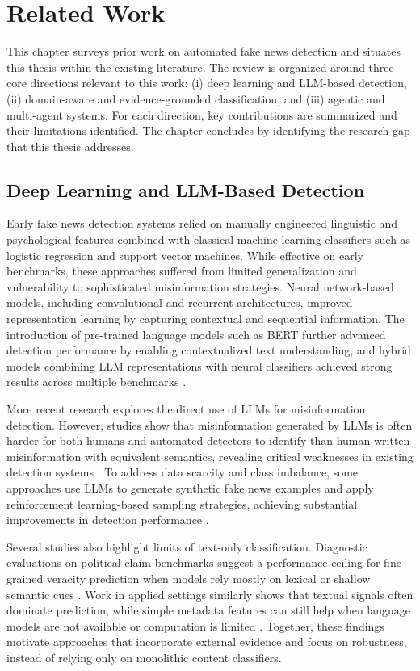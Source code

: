 \chapter{Related Work}

This chapter surveys prior work on automated fake news detection and situates this thesis within the existing literature. The review is organized around three core directions relevant to this work: (i) deep learning and LLM-based detection, (ii) domain-aware and 
evidence-grounded classification, and (iii) agentic and multi-agent systems. For each direction, key contributions are summarized and their limitations identified. The chapter concludes by identifying the research gap that this thesis addresses.

\section{Deep Learning and LLM-Based Detection}

Early fake news detection systems relied on manually engineered linguistic and psychological features combined with classical machine learning classifiers such as logistic regression and support vector machines. While effective on early benchmarks, these approaches suffered from limited generalization and vulnerability to sophisticated misinformation strategies. Neural network-based models, including convolutional and recurrent architectures, improved representation learning by capturing contextual and sequential information. The introduction of pre-trained language models such as BERT further advanced detection performance by enabling contextualized text understanding, and hybrid models combining LLM representations with neural classifiers achieved strong results across multiple benchmarks \cite{10.1145/3728725.3728739}.

More recent research explores the direct use of LLMs for misinformation detection. However, studies show that misinformation generated by LLMs is often harder for both humans and automated detectors to identify than human-written misinformation with equivalent semantics, revealing critical weaknesses in existing detection systems \cite{chen2024llmgeneratedmisinformationdetected}. To address data scarcity and class imbalance, some approaches use LLMs to generate synthetic fake news examples and apply reinforcement learning-based sampling strategies, achieving substantial improvements in detection performance \cite{tong-etal-2025-generate}.

Several studies also highlight limits of text-only classification. Diagnostic evaluations on political claim benchmarks suggest a performance ceiling for fine-grained veracity prediction when models rely mostly on lexical or shallow semantic cues \cite{hasan2025generalizationgapspoliticalfake}. Work in applied settings similarly shows that textual signals often dominate prediction, while simple metadata features can still help when language models are not available or computation is limited \cite{savatteri2025signalsreallymattermisinformation}. Together, these findings motivate approaches that incorporate external evidence and focus on robustness, instead of relying only on monolithic content classifiers.

